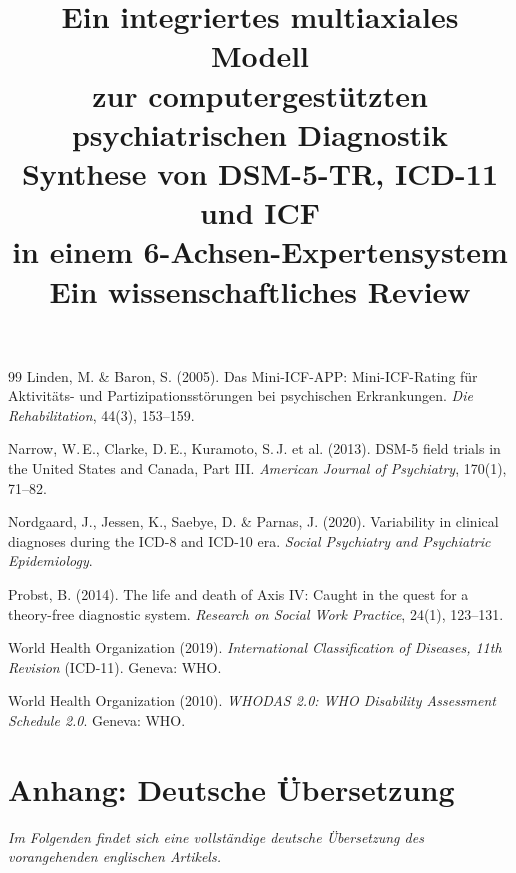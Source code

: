 \documentclass[11pt,a4paper]{article}
\begin{document}
\begin{thebibliography}{99}
Linden, M. \& Baron, S. (2005).
\newblock Das Mini-ICF-APP: Mini-ICF-Rating f\"ur Aktivit\"ats- und Partizipationsst\"orungen bei psychischen Erkrankungen.
\newblock \textit{Die Rehabilitation}, 44(3), 153--159.

Narrow, W.\,E., Clarke, D.\,E., Kuramoto, S.\,J. et al. (2013).
\newblock DSM-5 field trials in the United States and Canada, Part III.
\newblock \textit{American Journal of Psychiatry}, 170(1), 71--82.

Nordgaard, J., Jessen, K., Saebye, D. \& Parnas, J. (2020).
\newblock Variability in clinical diagnoses during the ICD-8 and ICD-10 era.
\newblock \textit{Social Psychiatry and Psychiatric Epidemiology}.

Probst, B. (2014).
\newblock The life and death of Axis IV: Caught in the quest for a theory-free diagnostic system.
\newblock \textit{Research on Social Work Practice}, 24(1), 123--131.

World Health Organization (2019).
\newblock \textit{International Classification of Diseases, 11th Revision} (ICD-11).
\newblock Geneva: WHO.

World Health Organization (2010).
\newblock \textit{WHODAS 2.0: WHO Disability Assessment Schedule 2.0}.
\newblock Geneva: WHO.

\end{thebibliography}

\newpage
\appendix
{}

\section*{Anhang: Deutsche Übersetzung}

\noindent\textit{Im Folgenden findet sich eine vollständige deutsche Übersetzung des vorangehenden englischen Artikels.}

\vspace{1.5em}


\title{\textbf{\huge Ein integriertes multiaxiales Modell\\zur computergest\"utzten psychiatrischen Diagnostik}\\[0.5em]
\Large Synthese von DSM-5-TR, ICD-11 und ICF\\in einem 6-Achsen-Expertensystem\\[0.3em]
\large Ein wissenschaftliches Review}
\end{document}
